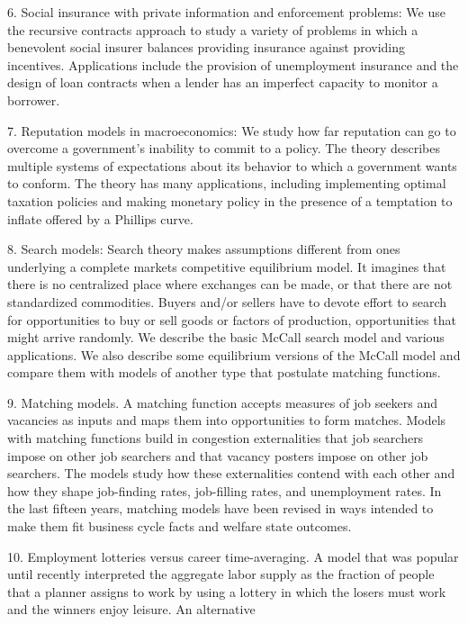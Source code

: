 \medskip
\item{6.}  Social insurance with private information and
enforcement problems: We use the recursive contracts approach to
study a variety of problems in which a benevolent social insurer
 balances providing insurance against
providing incentives.  Applications
include the provision of unemployment insurance
and the design of loan contracts when a lender
has an imperfect capacity to monitor a borrower.
\medskip
\item{7.}   Reputation  models in macroeconomics:   We study
how far reputation can go to overcome a government's
inability to  commit to a policy.   The theory describes
multiple systems of expectations about its behavior
to which a government wants to conform.  The theory
has many applications, including implementing optimal
taxation policies and  making monetary
policy in the presence of a temptation to inflate
offered by a Phillips curve.
\medskip
\item{8.}  Search models: Search theory
makes  assumptions
different from   ones underlying a complete markets competitive
equilibrium model.  It imagines that  there is no
centralized  place where exchanges can be made,
or that there are not standardized commodities.  Buyers
and/or sellers have to devote effort to search
for opportunities to buy or sell goods or factors of production, opportunities that might
arrive randomly. We describe the basic
McCall search model and various applications.
We also describe some equilibrium versions of the McCall model
and compare
them with  models of another  type that postulate
matching functions.
\medskip
\item {9.} Matching models.  A matching function
accepts measures of  job seekers and vacancies as inputs and maps them
into opportunities to  form matches.  Models with matching functions
build in congestion externalities that job searchers impose on  other job searchers
and that vacancy posters impose on other job searchers.  The models study how these externalities contend with each other
 and how they shape job-finding rates, job-filling rates, and unemployment rates.
In the last fifteen years, matching models have been revised in ways intended to make them
fit business cycle facts and welfare state outcomes.
\medskip
\item{10.} Employment lotteries versus career time-averaging.  A model that was popular until recently interpreted
 the aggregate labor supply
as the fraction of people that a planner assigns to work by using  a lottery
in which the losers must work and the winners enjoy leisure.  An  alternative
